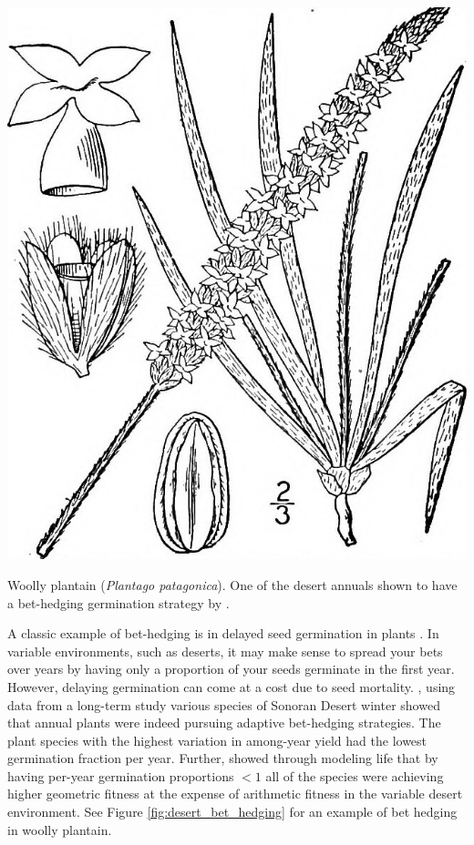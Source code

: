   \begin{marginfigure}
\begin{center}
\includegraphics[width= \textwidth]{illustration_images/single_locus_selection/woolly_plantain/20771670485_fb7e476748_b.jpg}
\end{center}
\caption{Woolly plantain ({\it Plantago patagonica}). One of the
  desert annuals shown to have a bet-hedging germination strategy by
  \citet{gremer2014bet}. } \label{fig:Woolly_plantain}
\end{marginfigure}

A classic example of bet-hedging is in delayed seed germination in
plants \citep{cohen1966optimizing}. In variable environments, such as
deserts, it may make sense to spread your bets over years by having
only a proportion of your seeds germinate in the first year. However,
delaying germination can come at a cost due to seed
mortality. \citet{gremer2014bet}, using data from a long-term study
various species of Sonoran Desert winter showed that annual plants
were indeed pursuing adaptive bet-hedging strategies.
The plant species with the highest variation in among-year yield had
the lowest germination fraction per year.  Further,
\citeauthor{gremer2014bet} showed through modeling life that by having
per-year germination proportions $<1$ all of the species were
achieving higher geometric fitness at the expense of arithmetic
fitness in the variable desert environment. See Figure
\ref{fig:desert_bet_hedging} for an example of bet hedging in woolly plantain.

